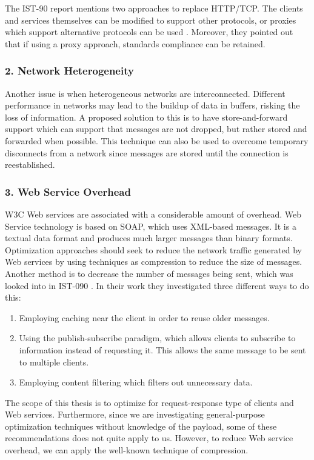 The IST-90 report mentions two approaches to replace HTTP/TCP. The clients and
services themselves can be modified to support other protocols, or proxies
which support alternative protocols can be used \cite{ist-090}. Moreover, they
pointed out that if using a proxy approach, standards compliance can be
retained.


\subsubsection{2. Network Heterogeneity}

Another issue is when heterogeneous networks are interconnected. Different
performance in networks may lead to the buildup of data in buffers, risking the
loss of information. A proposed solution to this is to have store-and-forward
support which can support that messages are not dropped, but rather stored and
forwarded when possible. This technique can also be used to overcome temporary
disconnects from a network since messages are stored until the connection is
reestablished.


\subsubsection{3. Web Service Overhead}

W3C Web services are associated with a considerable amount of overhead. Web
Service technology is based on SOAP, which uses XML-based messages. It is a
textual data format and produces much larger messages than binary formats.
Optimization approaches should seek to reduce the network traffic generated by
Web services by using techniques as compression to reduce the size of messages.
Another method is to decrease the number of messages being sent, which was
looked into in IST-090 \cite{ist-090}. In their work they investigated three
different ways to do this:

\begin{enumerate}
    \item Employing caching near the client in order to reuse older messages.
    \item Using the publish-subscribe paradigm, which allows clients to subscribe to
    information instead of requesting it. This allows the same message to be sent
    to multiple clients.
    \item Employing content filtering which filters out unnecessary data.
\end{enumerate}

The scope of this thesis is to optimize for request-response type of clients and
Web services. Furthermore, since we are investigating general-purpose
optimization techniques without knowledge of the payload, some of these
recommendations does not quite apply to us. However, to reduce Web service
overhead, we can apply the well-known technique of compression.

